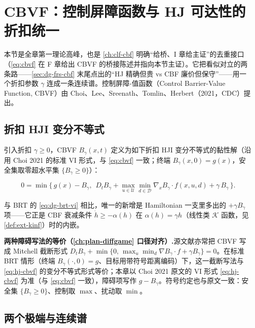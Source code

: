 \section{CBVF：控制屏障函数与 HJ 可达性的折扣统一}
\label{sec:hj-cbvf}

本节是全章第一理论高峰，也是 \cref{ch:clf-cbf} 明确“给桥、I 章给主证”的去重接口（\cref{eq:cbvf} 在 F 章给出 CBVF 的桥接陈述并指向本节主证）。它把看似对立的两条路——\cref{sec:dg-frs-cbf} 末尾点出的“HJ 精确但贵 vs CBF 廉价但保守”——用一个折扣参数 $\gamma$ 连成一条连续谱。控制屏障-值函数（Control Barrier-Value Function, CBVF）由 Choi、Lee、Sreenath、Tomlin、Herbert（2021，CDC）提出\cite{choi2021cbvf}。

\subsection{折扣 HJI 变分不等式}
\label{sec:hj-cbvf-vi}

引入折扣 $\gamma\ge0$，CBVF $B_\gamma(x,t)$ 定义为如下折扣 HJI 变分不等式的黏性解（沿用 Choi 2021 的标准 VI 形式，与 \cref{eq:cbvf} 一致；终端 $B_\gamma(x,0)=g(x)$，安全集取零超水平集 $\{B_\gamma\ge0\}$）：

\begin{equation}
  \boxed{\ 0=\min\Big\{\,g(x)-B_\gamma,\ \ D_tB_\gamma+\max_{u\in\mathcal U}\min_{d\in\mathcal D}\nabla_xB_\gamma\cdot f(x,u,d)+\gamma\,B_\gamma\,\Big\}.\ }
  \label{eq:hj-cbvf}
\end{equation}

与 BRT 的 \cref{eq:dg-brt-vi} 相比，唯一的新增是 Hamiltonian 一支里多出的 $+\gamma B_\gamma$ 项——它正是 CBF 衰减条件 $\dot h\ge-\alpha(h)$ 在 $\alpha(h)=\gamma h$（线性类 $\mathcal K$ 函数，见 \cref{def:ext-kinf}）时的内嵌。

\begin{note}
\textbf{两种障碍写法的等价（\cref{ch:plan-diffgame} 口径对齐）.}\;源文献亦常把 CBVF 写成 Mitchell 截断形式 $D_tB_\gamma+\min\{0,\,\max_u\min_d\nabla B_\gamma\cdot f+\gamma B_\gamma\}=0$。在标准 BRT 情形（终端 $B_\gamma(\cdot,0)=g$、目标用带符号距离编码）下，这一截断写法与 \cref{eq:hj-cbvf} 的变分不等式形式等价；本章以 Choi 2021 原文的 VI 形式 \cref{eq:hj-cbvf} 为准（与 \cref{eq:cbvf} 一致），障碍项写作 $g-B_\gamma$。符号约定也与原文一致：安全集 $\{B_\gamma\ge0\}$、控制取 $\max$、扰动取 $\min$。
\end{note}

\subsection{两个极端与连续谱}
\label{sec:hj-cbvf-spectrum}

